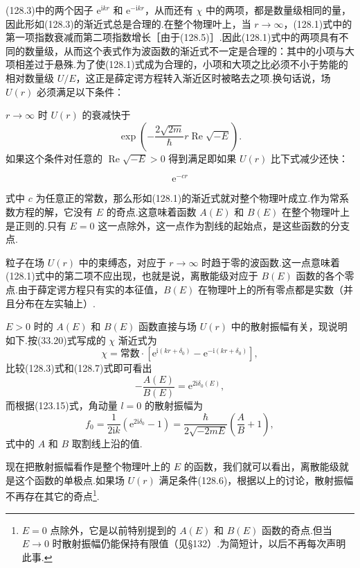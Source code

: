 (128.3)中的两个因子 $\mathrm{e}^{\mathrm{i}kr}$ 和 $\mathrm{e}^{-\mathrm{i}kr}$，从而还有 $\chi$ 中的两项，都是数量级相同的量，因此形如(128.3)的渐近式总是合理的.在整个物理叶上，当 $r\to\infty$，(128.1)式中的第一项指数衰减而第二项指数增长［由于(128.5)］.因此(128.1)式中的两项具有不同的数量级，从而这个表式作为波函数的渐近式不一定是合理的：其中的小项与大项相差过于悬殊.为了使(128.1)式成为合理的，小项和大项之比必须不小于势能的相对数量级 $U/E$，这正是薛定谔方程转入渐近区时被略去之项.换句话说，场 $U(r)$ 必须满足以下条件：

$r\to\infty$ 时 $U(r)$ 的衰减快于
\begin{equation}
  \exp\left(-\frac{2\sqrt{2m}}{\hbar}r\operatorname{Re}\sqrt{-E}\right).
\end{equation}
如果这个条件对任意的 $\operatorname{Re}\sqrt{-E}>0$ 得到满足即如果 $U(r)$ 比下式减少还快：
{\renewcommand{\theequation}{\arabic{section}.6a}%
\begin{equation}
  \mathrm{e}^{-cr}
\end{equation}
\addtocounter{equation}{-1}}
式中 $c$ 为任意正的常数，那么形如(128.1)的渐近式就对整个物理叶成立.作为常系数方程的解，它没有 $E$ 的奇点.这意味着函数 $A(E)$ 和 $B(E)$ 在整个物理叶上是正则的.只有 $E=0$ 这一点除外，这一点作为割线的起始点，是这些函数的分支点.

粒子在场 $U(r)$ 中的束缚态，对应于 $r\to\infty$ 时趋于零的波函数.这一点意味着(128.1)式中的第二项不应出现，也就是说，离散能级对应于 $B(E)$ 函数的各个零点.由于薛定谔方程只有实的本征值，$B(E)$ 在物理叶上的所有零点都是实数（并且分布在左实轴上）.

$E>0$ 时的 $A(E)$ 和 $B(E)$ 函数直接与场 $U(r)$ 中的散射振幅有关，现说明如下.按(33.20)式写成的 $\chi$ 渐近式为
\begin{equation}
  \chi=\text{常数}\cdot\left[\mathrm{e}^{\mathrm{i}(kr+\delta_0)}
  -\mathrm{e}^{-\mathrm{i}(kr+\delta_0)}\right],
\end{equation}
比较(128.3)式和(128.7)式即可看出
\begin{equation}
  -\frac{A(E)}{B(E)}=\mathrm{e}^{2\mathrm{i}\delta_0(E)},
\end{equation}
而根据(123.15)式，角动量 $l=0$ 的散射振幅为
\begin{equation}
  f_0=\frac{1}{2\mathrm{i}k}\left(\mathrm{e}^{2\mathrm{i}\delta_0}-1\right)
  =\frac{\hbar}{2\sqrt{-2mE}}\left(\frac{A}{B}+1\right),
\end{equation}
式中的 $A$ 和 $B$ 取割线上沿的值.

现在把散射振幅看作是整个物理叶上的 $E$ 的函数，我们就可以看出，离散能级就是这个函数的单极点.如果场 $U(r)$ 满足条件(128.6)，根据以上的讨论，散射振幅不再存在其它的奇点\footnote{$E=0$ 点除外，它是以前特别提到的 $A(E)$ 和 $B(E)$ 函数的奇点.但当 $E\to0$ 时散射振幅仍能保持有限值（见§132）.为简短计，以后不再每次声明此事.}.


